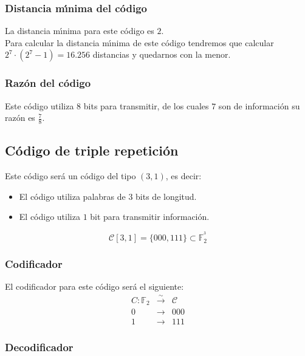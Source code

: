 \subsubsection{Distancia m\'{\i}nima del c\'odigo}

La distancia m\'{\i}nima para este c\'odigo es $2$.\\

Para calcular la distancia m\'{\i}nima de este c\'odigo tendremos que calcular
$2^7 \cdot (2^7 -1)=16.256$ distancias y quedarnos con la menor. 

\subsubsection{Raz\'on del c\'odigo}

Este c\'odigo utiliza $8$ bits para transmitir, de los cuales $7$ son de
informaci\'on su raz\'on es $\frac{7}{8}$.

\subsection{C\'odigo de triple repetici\'on} 

Este c\'odigo ser\'a un c\'odigo del tipo $(3,1)$, es decir:
\begin{itemize}
\item El c\'odigo utiliza palabras de $3$ bits de longitud.
\item El c\'odigo utiliza $1$ bit para transmitir informaci\'on.
\end{itemize}
\begin{displaymath}
\mathcal{C}[3,1] = \{000,111\}\subset \mathbb{F}^{^3}_2
\end{displaymath}

\subsubsection{Codificador}

El codificador para este c\'odigo ser\'a el siguiente:\\
\begin{eqnarray*}
C:\mathbb{F}_2&\stackrel{\sim}\longrightarrow & \mathcal{C} \\
0&\longrightarrow & 000 \\
1&\longrightarrow & 111
\end{eqnarray*}

\subsubsection{Decodificador}

